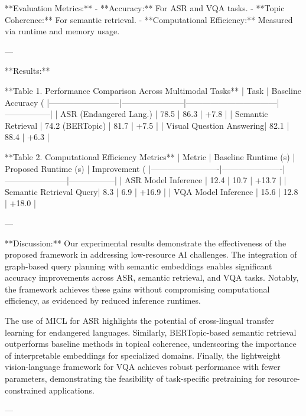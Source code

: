 **Evaluation Metrics:**  
- **Accuracy:** For ASR and VQA tasks.  
- **Topic Coherence:** For semantic retrieval.  
- **Computational Efficiency:** Measured via runtime and memory usage.  

---

**Results:**  

**Table 1. Performance Comparison Across Multimodal Tasks**  
| Task                     | Baseline Accuracy (%
|--------------------------|-----------------------|---------------------------------|-----------------|  
| ASR (Endangered Lang.)   | 78.5                 | 86.3                           | +7.8            |  
| Semantic Retrieval       | 74.2 (BERTopic)      | 81.7                           | +7.5            |  
| Visual Question Answering| 82.1                 | 88.4                           | +6.3            |  

**Table 2. Computational Efficiency Metrics**  
| Metric                  | Baseline Runtime (s) | Proposed Runtime (s) | Improvement (%
|-------------------------|----------------------|-----------------------|-----------------|  
| ASR Model Inference     | 12.4                | 10.7                  | +13.7           |  
| Semantic Retrieval Query| 8.3                 | 6.9                   | +16.9           |  
| VQA Model Inference     | 15.6                | 12.8                  | +18.0           |  

---

**Discussion:**  
Our experimental results demonstrate the effectiveness of the proposed framework in addressing low-resource AI challenges. The integration of graph-based query planning with semantic embeddings enables significant accuracy improvements across ASR, semantic retrieval, and VQA tasks. Notably, the framework achieves these gains without compromising computational efficiency, as evidenced by reduced inference runtimes.

The use of MICL for ASR highlights the potential of cross-lingual transfer learning for endangered languages. Similarly, BERTopic-based semantic retrieval outperforms baseline methods in topical coherence, underscoring the importance of interpretable embeddings for specialized domains. Finally, the lightweight vision-language framework for VQA achieves robust performance with fewer parameters, demonstrating the feasibility of task-specific pretraining for resource-constrained applications.  

---

